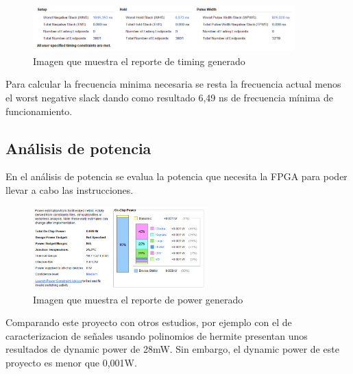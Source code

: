 	\begin{figure}[h!]
		\centering
		\includegraphics[width=0.9\textwidth]{./Images/img_res_experimentales/reportetiming.png}
		\caption{Imagen que muestra el reporte de timing generado}
		\label{fig:reporteTiming}
	\end{figure} 

	Para calcular la frecuencia minima necesaria se resta la frecuencia actual menos el worst negative slack dando como resultado 6,49 ns de frecuencia mínima de funcionamiento. 

\subsection{Análisis de potencia}

	En el análisis de potencia se evalua la potencia que necesita la FPGA para poder llevar a cabo las instrucciones.

	\begin{figure}[h!]
		\centering
		\includegraphics[width=0.6\textwidth]{./Images/img_res_experimentales/reportepower.png}
		\caption{Imagen que muestra el reporte de power generado}
		\label{fig:reportePower}
	\end{figure} 

	Comparando este proyecto con otros estudios, por ejemplo con el de caracterizacion de señales usando polinomios de hermite presentan unos resultados de dynamic power de 28mW.
	Sin embargo, el dynamic power de este proyecto es menor que 0,001W.








	